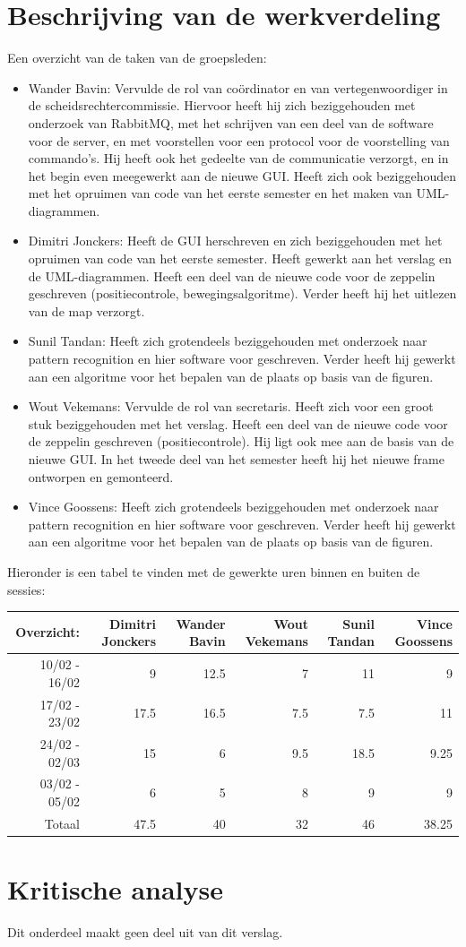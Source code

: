 \documentclass[eind]{penoverslag}
\begin{document}
\section{Beschrijving van de werkverdeling}
Een overzicht van de taken van de groepsleden: \\
\begin{itemize}
\item Wander Bavin: Vervulde de rol van co\"ordinator en van vertegenwoordiger in de scheidsrechtercommissie. Hiervoor heeft hij zich beziggehouden met onderzoek van RabbitMQ, met het schrijven van een deel van de software voor de server, en met voorstellen voor een protocol voor de voorstelling van commando's. Hij heeft ook het gedeelte van de communicatie verzorgt, en in het begin even meegewerkt aan de nieuwe GUI. Heeft zich ook beziggehouden met het opruimen van code van het eerste semester en het maken van UML-diagrammen.
\item Dimitri Jonckers: Heeft de GUI herschreven en zich beziggehouden met het opruimen van code van het eerste semester. Heeft gewerkt aan het verslag en de UML-diagrammen. Heeft een deel van de nieuwe code voor de zeppelin geschreven (positiecontrole, bewegingsalgoritme). Verder heeft hij het uitlezen van de map verzorgt.
\item Sunil Tandan: Heeft zich grotendeels beziggehouden met onderzoek naar pattern recognition en hier software voor geschreven. Verder heeft hij gewerkt aan een algoritme voor het bepalen van de plaats op basis van de figuren.
\item Wout Vekemans: Vervulde de rol van secretaris. Heeft zich voor een groot stuk beziggehouden met het verslag. Heeft een deel van de nieuwe code voor de zeppelin geschreven (positiecontrole). Hij ligt ook mee aan de basis van de nieuwe GUI. In het tweede deel van het semester heeft hij het nieuwe frame ontworpen en gemonteerd. 
\item Vince Goossens: Heeft zich grotendeels beziggehouden met onderzoek naar pattern recognition en hier software voor geschreven. Verder heeft hij gewerkt aan een algoritme voor het bepalen van de plaats op basis van de figuren.
\end{itemize}

Hieronder is een tabel te vinden met de gewerkte uren binnen en buiten de sessies: \\

\begin{tabular}{r||r|r|r|r|r}
Overzicht: & Dimitri Jonckers & Wander Bavin & Wout Vekemans & Sunil Tandan & Vince Goossens \\
\hline \hline
10/02 - 16/02 & 9 & 12.5 & 7 & 11 & 9 \\
17/02 - 23/02 & 17.5 & 16.5 & 7.5 & 7.5 & 11 \\
24/02 - 02/03 & 15 & 6 & 9.5 & 18.5 & 9.25 \\
03/02 - 05/02 & 6 & 5 & 8 & 9 & 9 \\
\hline \hline
Totaal & 47.5 & 40 & 32 & 46 & 38.25 \\
\end{tabular}


\section{Kritische analyse}
Dit onderdeel maakt geen deel uit van dit verslag.
\end{document}
